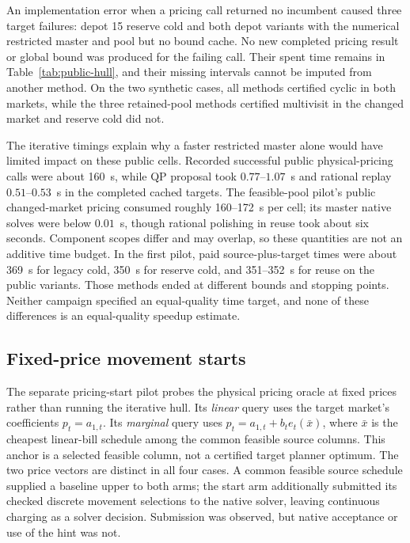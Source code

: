 An implementation error when a pricing call returned no incumbent caused three target failures: depot 15 reserve cold and both depot variants with the numerical restricted master and pool but no bound cache.  No new completed pricing result or global bound was produced for the failing call.  Their spent time remains in Table~\ref{tab:public-hull}, and their missing intervals cannot be imputed from another method.  On the two synthetic cases, all methods certified cyclic in both markets, while the three retained-pool methods certified multivisit in the changed market and reserve cold did not.

The iterative timings explain why a faster restricted master alone would have limited impact on these public cells.  Recorded successful public physical-pricing calls were about 160~s, while QP proposal took $0.77$--$1.07$~s and rational replay $0.51$--$0.53$~s in the completed cached targets.  The feasible-pool pilot's public changed-market pricing consumed roughly 160--172~s per cell; its master native solves were below $0.01$~s, though rational polishing in reuse took about six seconds.  Component scopes differ and may overlap, so these quantities are not an additive time budget.  In the first pilot, paid source-plus-target times were about 369~s for legacy cold, 350~s for reserve cold, and 351--352~s for reuse on the public variants.  Those methods ended at different bounds and stopping points.  Neither campaign specified an equal-quality time target, and none of these differences is an equal-quality speedup estimate.

\subsection{Fixed-price movement starts}

The separate pricing-start pilot probes the physical pricing oracle at fixed prices rather than running the iterative hull.  Its \emph{linear} query uses the target market's coefficients $p_t=a_{1,t}$.  Its \emph{marginal} query uses $p_t=a_{1,t}+b_te_t(\bar x)$, where $\bar x$ is the cheapest linear-bill schedule among the common feasible source columns.  This anchor is a selected feasible column, not a certified target planner optimum.  The two price vectors are distinct in all four cases.  A common feasible source schedule supplied a baseline upper to both arms; the start arm additionally submitted its checked discrete movement selections to the native solver, leaving continuous charging as a solver decision.  Submission was observed, but native acceptance or use of the hint was not.

